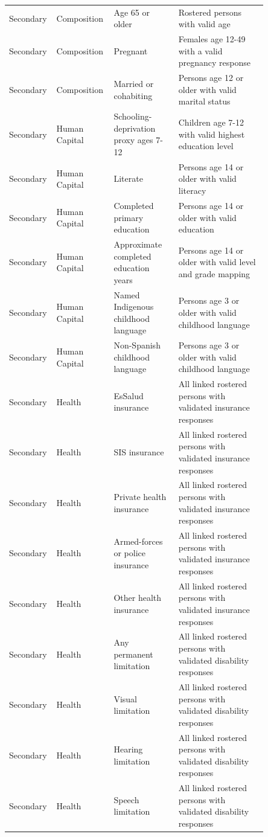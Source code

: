 \begin{longtable}{p{0.10\linewidth}p{0.18\linewidth}p{0.24\linewidth}p{0.33\linewidth}}
Secondary & Composition & Age 65 or older & Rostered persons with valid age \\
Secondary & Composition & Pregnant & Females age 12-49 with a valid pregnancy response \\
Secondary & Composition & Married or cohabiting & Persons age 12 or older with valid marital status \\
Secondary & Human Capital & Schooling-deprivation proxy ages 7-12 & Children age 7-12 with valid highest education level \\
Secondary & Human Capital & Literate & Persons age 14 or older with valid literacy \\
Secondary & Human Capital & Completed primary education & Persons age 14 or older with valid education \\
Secondary & Human Capital & Approximate completed education years & Persons age 14 or older with valid level and grade mapping \\
Secondary & Human Capital & Named Indigenous childhood language & Persons age 3 or older with valid childhood language \\
Secondary & Human Capital & Non-Spanish childhood language & Persons age 3 or older with valid childhood language \\
Secondary & Health & EsSalud insurance & All linked rostered persons with validated insurance responses \\
Secondary & Health & SIS insurance & All linked rostered persons with validated insurance responses \\
Secondary & Health & Private health insurance & All linked rostered persons with validated insurance responses \\
Secondary & Health & Armed-forces or police insurance & All linked rostered persons with validated insurance responses \\
Secondary & Health & Other health insurance & All linked rostered persons with validated insurance responses \\
Secondary & Health & Any permanent limitation & All linked rostered persons with validated disability responses \\
Secondary & Health & Visual limitation & All linked rostered persons with validated disability responses \\
Secondary & Health & Hearing limitation & All linked rostered persons with validated disability responses \\
Secondary & Health & Speech limitation & All linked rostered persons with validated disability responses \\

\end{longtable}

